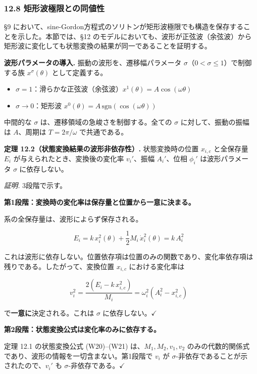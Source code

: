 \documentclass[a4paper,11pt]{ltjsarticle}
\providecommand{\tightlist}{\setlength{\itemsep}{0pt}\setlength{\parskip}{0pt}}
\begin{document}
\subsubsection{12.8
矩形波極限との同値性}\label{ux77e9ux5f62ux6ce2ux6975ux9650ux3068ux306eux540cux5024ux6027}

§9
において、sine-Gordon方程式のソリトンが矩形波極限でも構造を保存することを示した。本節では、§12
のモデルにおいても、波形が正弦波（余弦波）から矩形波に変化しても状態変換の結果が同一であることを証明する。

\textbf{波形パラメータの導入.} 振動の波形を、遷移幅パラメータ
\(\sigma\)（\(0 < \sigma \leq 1\)）で制御する族 \(x^\sigma(\theta)\)
として定義する。

\begin{itemize}
\tightlist
\item
  \(\sigma = 1\)：滑らかな正弦波（余弦波）\(x^1(\theta) = A\cos(\omega\theta)\)
\item
  \(\sigma \to 0\)：矩形波
  \(x^0(\theta) = A\,\mathrm{sgn}(\cos(\omega\theta))\)
\end{itemize}

中間的な \(\sigma\) は、遷移領域の急峻さを制御する。全ての \(\sigma\)
に対して、振動の振幅は \(A\)、周期は \(T = 2\pi/\omega\) で共通である。

\textbf{定理 12.2（状態変換結果の波形非依存性）.} 状態変換時の位置
\(x_{i,c}\) と全保存量 \(E_i\) が与えられたとき、変換後の変化率
\(v_i'\)、振幅 \(A_i'\)、位相 \(\phi_i'\) は波形パラメータ \(\sigma\)
に依存しない。

\emph{証明.} 3段階で示す。

\textbf{第1段階：変換時の変化率は保存量と位置から一意に決まる。}

系の全保存量は、波形によらず保存される。

\[E_i = k\,x_i^2(\theta) + \frac{1}{2}M_i\,\dot{x}_i^2(\theta) = k\,A_i^2 \tag{W27}\]

これは波形に依存しない。位置依存項は位置のみの関数であり、変化率依存項は残りである。したがって、変換位置
\(x_{i,c}\) における変化率は

\[v_i^2 = \frac{2(E_i - k\,x_{i,c}^2)}{M_i} = \omega_i^2(A_i^2 - x_{i,c}^2) \tag{W28}\]

で\textbf{一意に}決定される。これは \(\sigma\)
に依存しない。\(\checkmark\)

\textbf{第2段階：状態変換公式は変化率のみに依存する。}

定理 12.1 の状態変換公式 (W20)--(W21) は、\(M_1, M_2, v_1, v_2\)
のみの代数的関係式であり、波形の情報を一切含まない。第1段階で \(v_i\) が
\(\sigma\)-非依存であることが示されたので、\(v_i'\) も
\(\sigma\)-非依存である。\(\checkmark\)
\end{document}
